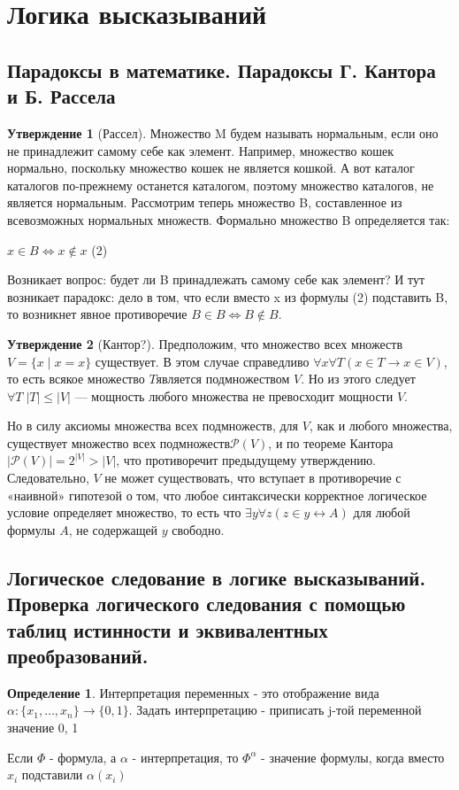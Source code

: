 \documentclass[a4paper]{article}
\theoremstyle{definition}
\newtheorem*{definition}{Определение}
\newtheorem*{statement}{Утверждение}
\theoremstyle{remark}
\begin{document}
    \section{Логика высказываний}
    \subsection{Парадоксы в математике. Парадоксы Г. Кантора и  Б. Рассела}
    \begin{statement}[Рассел]
        Множество M будем называть нормальным, если оно не
        принадлежит самому себе как элемент. Например, множество кошек нормально, поскольку множество кошек не является кошкой. А вот каталог каталогов
        по-прежнему останется каталогом, поэтому множество каталогов, не является
        нормальным. Рассмотрим теперь множество B, составленное из всевозможных
        нормальных множеств. Формально множество B определяется так:

        $x \in  B \Leftrightarrow  x \notin  x $ (2)

        Возникает вопрос: будет ли B принадлежать самому себе как элемент? И тут
        возникает парадокс: дело в том, что если вместо x из формулы (2) подставить
        B, то возникнет явное противоречие
        $B \in  B \Leftrightarrow B \notin  B.$
    \end{statement}
    \begin{statement}[Кантор?]
        Предположим, что множество всех множеств ${ V=\{x\mid x=x\}}$ существует.
        В этом случае справедливо ${ \forall x\forall T(x\in T\rightarrow x\in V)}$, то есть всякое множество
        ${ T} $является подмножеством ${ V}$. Но из этого следует
        ${ \forall T\;|T|\leqslant |V|}$ — мощность
        любого множества не превосходит мощности ${ V}$.

        Но в силу аксиомы множества всех подмножеств, для ${ V}$, как и любого множества,
        существует множество всех подмножеств$ { {\mathcal {P}}(V)}$, и по
        теореме Кантора ${ |{\mathcal {P}}(V)|=2^{|V|}>|V|}$,
        что противоречит предыдущему утверждению. Следовательно, ${ V}$ не может существовать,
        что вступает в противоречие с «наивной» гипотезой о том, что любое синтаксически корректное логическое условие
        определяет множество, то есть что ${ \exists y\forall z(z\in y\leftrightarrow A)}$ для любой формулы ${ A}$,
        не содержащей ${ y}$ свободно.
    \end{statement}
    \subsection{Логическое следование в логике высказываний. Проверка логического следования с помощью таблиц истинности и эквивалентных преобразований.}
    \begin{definition}
    Интерпретация переменных - это отображение вида $\alpha : \{x_1, \dots, x_n \} \to \{ 0, 1\} $.
    Задать интерпретацию - приписать j-той переменной значение 0, 1
    \end{definition}
    Если $\Phi$ - формула, а $\alpha$ - интерпретация, то $\Phi^\alpha$ - значение формулы, когда вместо $x_i$ подставили $\alpha (x_i)$
    
\end{document}
